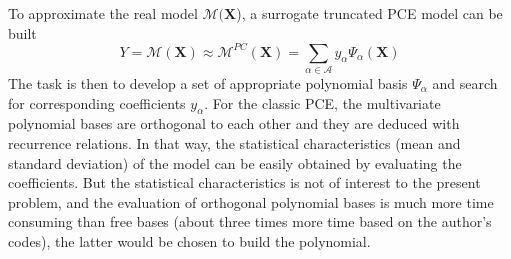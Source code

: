 To approximate the real model $\mathcal{M}(\boldsymbol{X}$), a surrogate truncated PCE model can be built
\begin{equation}
    Y=\mathcal{M}(\boldsymbol{X})\approx \mathcal{M}^{PC}(\boldsymbol{X})=\sum_{\alpha\in \mathcal{A}}y_{\alpha}\Psi_{\alpha}(\boldsymbol{X})
\end{equation}
\noindent
The task is then to develop a set of appropriate polynomial basis $\Psi_{\alpha}$ and search for corresponding coefficients $y_{\alpha}$. For the classic PCE, the multivariate polynomial bases are orthogonal to each other and they are deduced with recurrence relations. In that way, the statistical characteristics (mean and standard deviation) of the model can be easily obtained by evaluating the coefficients. But the statistical characteristics is not of interest to the present problem, and the evaluation of orthogonal polynomial bases is much more time consuming than free bases (about three times more time based on the author's codes), the latter would be chosen to build the polynomial.

